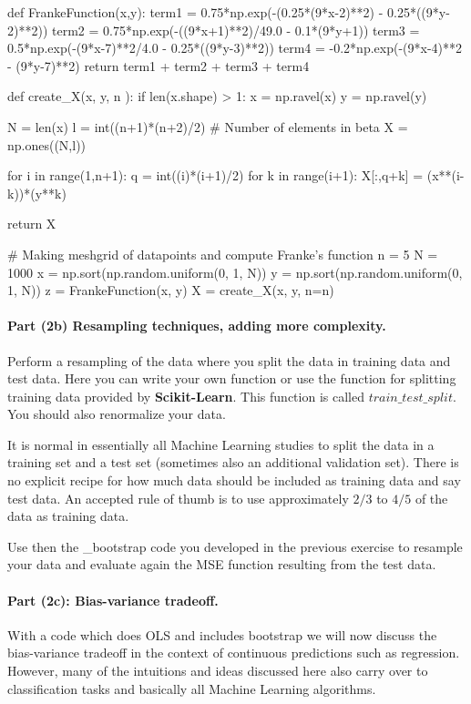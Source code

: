 \documentclass[%
oneside,                 %
final,                   %
10pt]{article}
\begin{document}
\bpycod
def FrankeFunction(x,y):
	term1 = 0.75*np.exp(-(0.25*(9*x-2)**2) - 0.25*((9*y-2)**2))
	term2 = 0.75*np.exp(-((9*x+1)**2)/49.0 - 0.1*(9*y+1))
	term3 = 0.5*np.exp(-(9*x-7)**2/4.0 - 0.25*((9*y-3)**2))
	term4 = -0.2*np.exp(-(9*x-4)**2 - (9*y-7)**2)
	return term1 + term2 + term3 + term4


def create_X(x, y, n ):
	if len(x.shape) > 1:
		x = np.ravel(x)
		y = np.ravel(y)

	N = len(x)
	l = int((n+1)*(n+2)/2)		# Number of elements in beta
	X = np.ones((N,l))

	for i in range(1,n+1):
		q = int((i)*(i+1)/2)
		for k in range(i+1):
			X[:,q+k] = (x**(i-k))*(y**k)

	return X


# Making meshgrid of datapoints and compute Franke's function
n = 5
N = 1000
x = np.sort(np.random.uniform(0, 1, N))
y = np.sort(np.random.uniform(0, 1, N))
z = FrankeFunction(x, y)
X = create_X(x, y, n=n)    

\epycod


\paragraph{Part (2b) Resampling techniques, adding more complexity.}
Perform a resampling of the data where you split the data in training
data and test data. Here you can write your own function or use the
function for splitting training data provided by \textbf{Scikit-Learn}.
This function is called $train\_test\_split$.   You should also renormalize your data.

It is normal in essentially all Machine Learning studies to split the
data in a training set and a test set (sometimes also an additional
validation set).  There
is no explicit recipe for how much data should be included as training
data and say test data.  An accepted rule of thumb is to use
approximately $2/3$ to $4/5$ of the data as training data.

Use then the _bootstrap code you developed in the previous exercise to resample your data
and evaluate again the MSE function resulting
from the test data. 

\paragraph{Part (2c): Bias-variance tradeoff.}
With a code which does OLS and includes bootstrap
we will now discuss the bias-variance tradeoff in the context of
continuous predictions such as regression. However, many of the
intuitions and ideas discussed here also carry over to classification
tasks and basically all Machine Learning algorithms. 
\end{document}
